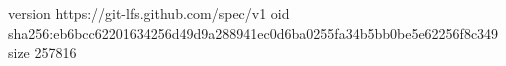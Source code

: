 version https://git-lfs.github.com/spec/v1
oid sha256:eb6bcc62201634256d49d9a288941ec0d6ba0255fa34b5bb0be5e62256f8c349
size 257816
